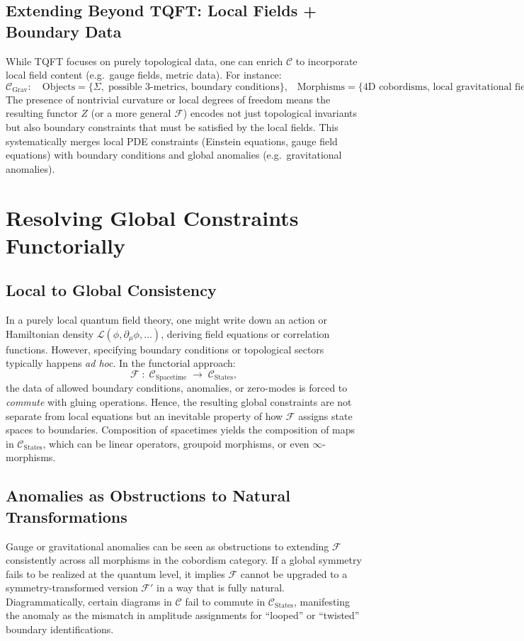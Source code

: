 \documentclass[12pt]{article}
\begin{document}
\subsection{Extending Beyond TQFT: Local Fields + Boundary Data}
While TQFT focuses on purely topological data, one can enrich $\mathcal{C}$ to incorporate local field content (e.g.\ gauge fields, metric data).
For instance:
\[
\mathcal{C}_{\mathrm{Grav}}: \quad \text{Objects} = \{\Sigma, \; \text{possible 3-metrics, boundary conditions}\}, 
\;\;\; \text{Morphisms} = \{\text{4D cobordisms, local gravitational fields}\}.
\]
The presence of nontrivial curvature or local degrees of freedom means the resulting functor $Z$ (or a more general $\mathcal{F}$)
encodes not just topological invariants but also boundary constraints that must be satisfied by the local fields.
This systematically merges local PDE constraints (Einstein equations, gauge field equations) with boundary conditions and global anomalies
(e.g.\ gravitational anomalies).

\section{Resolving Global Constraints Functorially}
\label{sec:Resolutions}

\subsection{Local to Global Consistency}
In a purely local quantum field theory, one might write down an action or Hamiltonian density $\mathcal{L}(\phi,\partial_\mu \phi,\dots)$,
deriving field equations or correlation functions. However, specifying boundary conditions or topological sectors typically happens
\emph{ad hoc}. In the functorial approach:
\begin{equation}
\mathcal{F} \;:\; \mathcal{C}_{\mathrm{Spacetime}} \;\longrightarrow\; \mathcal{C}_{\mathrm{States}},
\end{equation}
the data of allowed boundary conditions, anomalies, or zero-modes is forced to \emph{commute} with gluing operations.
Hence, the resulting global constraints are not separate from local equations but an inevitable property of how $\mathcal{F}$
assigns state spaces to boundaries. Composition of spacetimes yields the composition of maps in $\mathcal{C}_{\mathrm{States}}$,
which can be linear operators, groupoid morphisms, or even $\infty$-morphisms.

\subsection{Anomalies as Obstructions to Natural Transformations}
Gauge or gravitational anomalies can be seen as obstructions to extending $\mathcal{F}$ consistently across all morphisms
in the cobordism category. If a global symmetry fails to be realized at the quantum level, it implies $\mathcal{F}$
cannot be upgraded to a symmetry-transformed version $\mathcal{F}'$ in a way that is fully natural. 
Diagrammatically, certain diagrams in $\mathcal{C}$ fail to commute in $\mathcal{C}_{\mathrm{States}}$,
manifesting the anomaly as the mismatch in amplitude assignments for “looped” or “twisted” boundary identifications.
\end{document}
